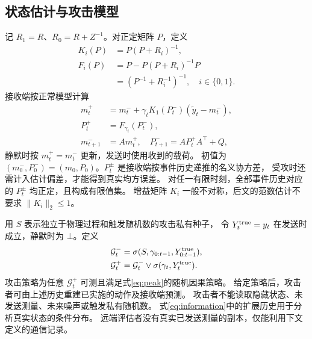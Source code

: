 \subsection{状态估计与攻击模型}
记 $R_1=R$、$R_0=R+Z^{-1}$。对正定矩阵 $P$，定义
\begin{equation}
 \begin{aligned}
 K_i(P)&=P(P+R_i)^{-1},\\
 F_i(P)&=P-P(P+R_i)^{-1}P\\
       &=(P^{-1}+R_i^{-1})^{-1},\quad i\in\{0,1\}.
 \end{aligned}
 \label{eq:gains}
\end{equation}
接收端按正常模型计算
\begin{equation}
 \begin{aligned}
 m_t^+&=m_t^-+\gamma_tK_1(P_t^-)(\widetilde y_t-m_t^-),\\
 P_t^+&=F_{\gamma_t}(P_t^-),\\
 m_{t+1}^-&=Am_t^+,\quad P_{t+1}^-=AP_t^+A^\top+Q,
 \end{aligned}
 \label{eq:receiver}
\end{equation}
静默时按 $m_t^+=m_t^-$ 更新，发送时使用收到的载荷。
初值为 $(m_0^-,P_0^-)=(m_0,P_0)$。$P_t^\pm$ 是接收端按事件历史递推的名义协方差，
受攻时还需计入估计偏差，才能得到真实均方误差。
对任一有限时刻，全部事件历史对应的 $P_t^\pm$ 均正定，且构成有限值集。
增益矩阵 $K_i$ 一般不对称，后文的范数估计不要求 $\|K_i\|_2\le1$。

用 $S$ 表示独立于物理过程和触发随机数的攻击私有种子，
令 $Y_t^{\rm true}=y_t$ 在发送时成立，静默时为 $\bot$。定义
\begin{equation}
 \begin{aligned}
 \mathcal G_t^-&=\sigma(S,\gamma_{0:t-1},Y_{0:t-1}^{\rm true}),\\
 \mathcal G_t^+&=\mathcal G_t^-\vee\sigma(\gamma_t,Y_t^{\rm true}).
 \end{aligned}
 \label{eq:information}
\end{equation}
攻击策略为任意 $\mathcal G_t^+$ 可测且满足式\eqref{eq:peak}的随机因果策略。
给定策略后，攻击者可由上述历史重建已实施的动作及接收端预测。
攻击者不能读取隐藏状态、未发送测量、未来噪声或触发私有随机数。
式\eqref{eq:information}中的扩展历史用于分析真实状态的条件分布。
远端评估者没有真实已发送测量的副本，仅能利用下文定义的通信记录。

